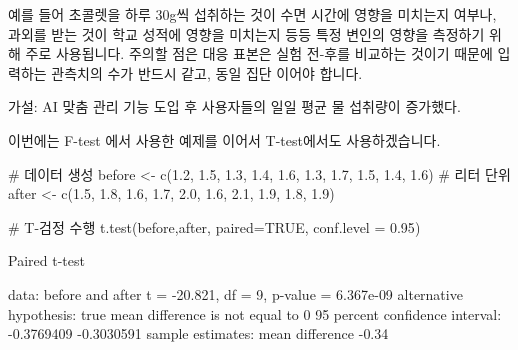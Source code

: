 \documentclass[
  letterpaper,
]{book}
\newenvironment{Shaded}{\begin{snugshade}}{\end{snugshade}}
\newcommand{\AttributeTok}[1]{\textcolor[rgb]{0.40,0.45,0.13}{#1}}
\newcommand{\CommentTok}[1]{\textcolor[rgb]{0.37,0.37,0.37}{#1}}
\newcommand{\ConstantTok}[1]{\textcolor[rgb]{0.56,0.35,0.01}{#1}}
\newcommand{\DecValTok}[1]{\textcolor[rgb]{0.68,0.00,0.00}{#1}}
\newcommand{\FloatTok}[1]{\textcolor[rgb]{0.68,0.00,0.00}{#1}}
\newcommand{\FunctionTok}[1]{\textcolor[rgb]{0.28,0.35,0.67}{#1}}
\newcommand{\NormalTok}[1]{\textcolor[rgb]{0.00,0.23,0.31}{#1}}
\newcommand{\OtherTok}[1]{\textcolor[rgb]{0.00,0.23,0.31}{#1}}
\newcommand{\SpecialCharTok}[1]{\textcolor[rgb]{0.37,0.37,0.37}{#1}}
\renewenvironment{Shaded}
    {\begin{snugshade}
    \begin{singlespace}
    \linespread{1}
    }
    {\end{singlespace}
    \end{snugshade}
}
\begin{document}
\begin{itemize}
  예를 들어 초콜렛을 하루 30g씩 섭취하는 것이 수면 시간에 영향을
  미치는지 여부나, 과외를 받는 것이 학교 성적에 영향을 미치는지 등등
  특정 변인의 영향을 측정하기 위해 주로 사용됩니다. 주의할 점은 대응
  표본은 실험 전-후를 비교하는 것이기 때문에 입력하는 관측치의 수가
  반드시 같고, 동일 집단 이어야 합니다.

  가설: AI 맞춤 관리 기능 도입 후 사용자들의 일일 평균 물 섭취량이
  증가했다.

  이번에는 F-test 에서 사용한 예제를 이어서 T-test에서도 사용하겠습니다.

\begin{Shaded}
\begin{Highlighting}[]
\CommentTok{\# 데이터 생성}
\NormalTok{before }\OtherTok{\textless{}{-}} \FunctionTok{c}\NormalTok{(}\FloatTok{1.2}\NormalTok{, }\FloatTok{1.5}\NormalTok{, }\FloatTok{1.3}\NormalTok{, }\FloatTok{1.4}\NormalTok{, }\FloatTok{1.6}\NormalTok{, }\FloatTok{1.3}\NormalTok{, }\FloatTok{1.7}\NormalTok{, }\FloatTok{1.5}\NormalTok{, }\FloatTok{1.4}\NormalTok{, }\FloatTok{1.6}\NormalTok{)  }\CommentTok{\# 리터 단위}
\NormalTok{after }\OtherTok{\textless{}{-}} \FunctionTok{c}\NormalTok{(}\FloatTok{1.5}\NormalTok{, }\FloatTok{1.8}\NormalTok{, }\FloatTok{1.6}\NormalTok{, }\FloatTok{1.7}\NormalTok{, }\FloatTok{2.0}\NormalTok{, }\FloatTok{1.6}\NormalTok{, }\FloatTok{2.1}\NormalTok{, }\FloatTok{1.9}\NormalTok{, }\FloatTok{1.8}\NormalTok{, }\FloatTok{1.9}\NormalTok{)}

\CommentTok{\# T{-}검정 수행}
\FunctionTok{t.test}\NormalTok{(before,after, }\AttributeTok{paired=}\ConstantTok{TRUE}\NormalTok{, }\AttributeTok{conf.level =} \FloatTok{0.95}\NormalTok{)}
\end{Highlighting}
\end{Shaded}

\begin{Shaded}
\begin{Highlighting}[]
\NormalTok{Paired t}\SpecialCharTok{{-}}\NormalTok{test}

\NormalTok{data}\SpecialCharTok{:}\NormalTok{  before and after}
\NormalTok{t }\OtherTok{=} \SpecialCharTok{{-}}\FloatTok{20.821}\NormalTok{, df }\OtherTok{=} \DecValTok{9}\NormalTok{, p}\SpecialCharTok{{-}}\NormalTok{value }\OtherTok{=} \FloatTok{6.367e{-}09}
\NormalTok{alternative hypothesis}\SpecialCharTok{:}\NormalTok{ true mean difference is not equal to }\DecValTok{0}
\DecValTok{95}\NormalTok{ percent confidence interval}\SpecialCharTok{:}
 \SpecialCharTok{{-}}\FloatTok{0.3769409} \SpecialCharTok{{-}}\FloatTok{0.3030591}
\NormalTok{sample estimates}\SpecialCharTok{:}
\NormalTok{mean difference }
          \SpecialCharTok{{-}}\FloatTok{0.34} 
\end{Highlighting}
\end{Shaded}


\end{itemize}
\end{document}
